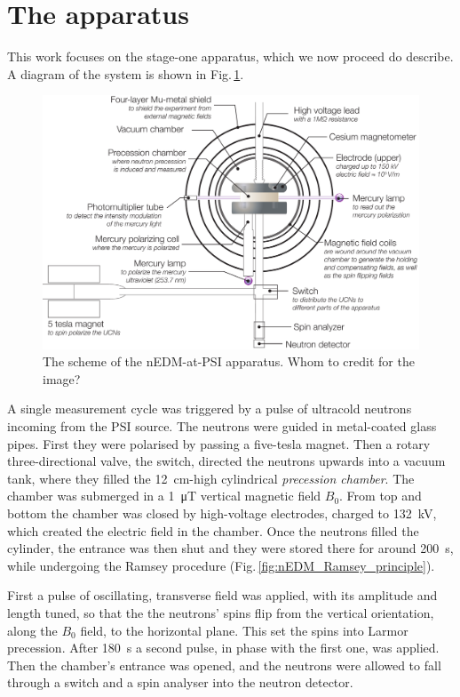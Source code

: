 \section{The apparatus}
This work focuses on the stage-one apparatus, which we now proceed do describe. A diagram of the system is shown in Fig.\,\ref{fig:nEDM_scheme}.

\begin{figure}
  \centering
  \includegraphics[width=\linewidth]{gfx/nEDMatPSI/apparatus-cartoon-main-and-sub-labels.pdf}
  \caption{The scheme of the nEDM-at-PSI apparatus. Whom to credit for the image?}
  \label{fig:nEDM_scheme}
\end{figure}

A single measurement cycle was triggered by a pulse of ultracold neutrons incoming from the PSI source. The neutrons were guided in metal-coated glass pipes. First they were polarised by passing a five-tesla magnet. Then a rotary three-directional valve, the switch, directed the neutrons upwards into a vacuum tank, where they filled the \SI{12}{\centi\meter}-high cylindrical \emph{precession chamber}. The chamber was submerged in a \SI{1}{\micro\tesla} vertical magnetic field $B_0$. From top and bottom the chamber was closed by high-voltage electrodes, charged to \SI{132}{\kilo\volt}, which created the electric field in the chamber. Once the neutrons filled the cylinder, the entrance was then shut and they were stored there for around \SI{200}{\second}, while undergoing the Ramsey procedure (Fig.\,\ref{fig:nEDM_Ramsey_principle}).

First a pulse of oscillating, transverse field was applied, with its amplitude and length tuned, so that the the neutrons' spins flip from the vertical orientation, along the $B_0$ field, to the horizontal plane. This set the spins into Larmor precession. After \SI{180}{\second} a second pulse, in phase with the first one, was applied. Then the chamber's entrance was opened, and the neutrons were allowed to fall through a switch and a spin analyser into the neutron detector.

